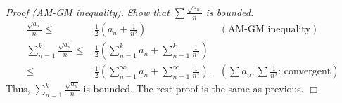 \documentclass{article}
\begin{document}
\emph{Proof (AM-GM inequality).}
\emph{Show that $\sum\frac{\sqrt{a_n}}{n}$ is bounded.}
\begin{align*}
\frac{\sqrt{a_n}}{n}
\leq&
\frac{1}{2}
\left( a_n + \frac{1}{n^2} \right)
  &(\text{AM-GM inequality}) \\
\sum_{n=1}^{k} \frac{\sqrt{a_n}}{n}
\leq&
\frac{1}{2}
\left( \sum_{n=1}^{k} a_n + \sum_{n=1}^{k} \frac{1}{n^2} \right) \\
\leq&
\frac{1}{2}
\left( \sum_{n=1}^{\infty} a_n + \sum_{n=1}^{\infty} \frac{1}{n^2} \right).
  &\left(\text{$\sum{a_n}, \sum{\frac{1}{n^2}}$: convergent}\right)
\end{align*}
Thus, $\sum_{n=1}^{k}\frac{\sqrt{a_n}}{n}$ is bounded.
The rest proof is the same as previous.
$\Box$ \\\\



\end{document}
